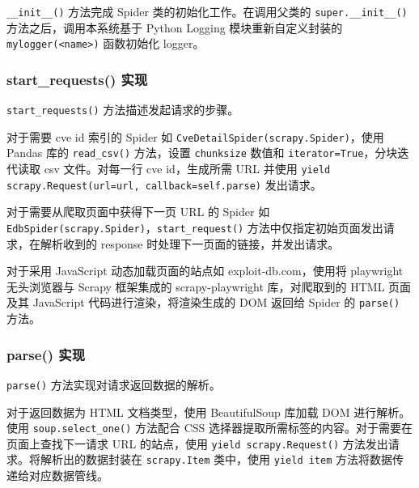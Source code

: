 \documentclass[a4paper,AutoFakeBold,oneside,12pt]{book}
\begin{document}
\lstinline[style = python]|__init__()| 方法完成 Spider 类的初始化工作。在调用父类的 \lstinline|super.__init__()| 方法之后，调用本系统基于 Python Logging 模块重新自定义封装的 \lstinline[style = python]|mylogger(<name>)| 函数初始化 logger。

\subsubsection{start{\_}requests() 实现}
\lstinline[style = python]|start_requests()| 方法描述发起请求的步骤。

对于需要 cve id 索引的 Spider 如 \lstinline[style = python]|CveDetailSpider(scrapy.Spider)|，使用 Pandas 库的 \lstinline[style = python]|read_csv()| 方法，设置 \verb|chunksize| 数值和 \verb|iterator=True|，分块迭代读取 csv 文件。对每一行 cve id，生成所需 URL 并使用 \lstinline[style = python]|yield scrapy.Request(url=url, callback=self.parse)| 发出请求。

对于需要从爬取页面中获得下一页 URL 的 Spider 如 \lstinline[style = python]|EdbSpider(scrapy.Spider)|，\linebreak \lstinline[style = python]|start_request()| 方法中仅指定初始页面发出请求，在解析收到的 response 时处理下一页面的链接，并发出请求。

对于采用 JavaScript 动态加载页面的站点如 exploit-db.com，使用将 playwright 无头浏览器与 Scrapy 框架集成的 scrapy-playwright 库，对爬取到的 HTML 页面及其 JavaScript 代码进行渲染，将渲染生成的 DOM 返回给 Spider 的 \lstinline[style = python]|parse()| 方法。

\subsubsection{parse() 实现}

\lstinline[style = python]|parse()| 方法实现对请求返回数据的解析。

对于返回数据为 HTML 文档类型，使用 BeautifulSoup 库加载 DOM 进行解析。使用 \lstinline[style = python]|soup.select_one()| 方法配合 CSS 选择器提取所需标签的内容。对于需要在页面上查找下一请求 URL 的站点，使用 \lstinline[style = python]|yield scrapy.Request()| 方法发出请求。将解析出的数据封装在 \lstinline[style = python]|scrapy.Item| 类中，使用 \lstinline[style = python]|yield item| 方法将数据传递给对应数据管线。
\end{document}
